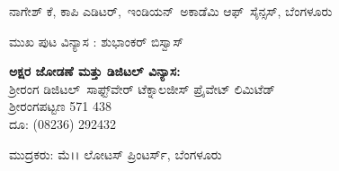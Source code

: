 {{\noindent
ನಾಗೇಶ್ ಕೆ, ಕಾಪಿ ಎಡಿಟರ್,\, ಇಂಡಿಯನ್\, ಅಕಾಡೆಮಿ ಆಫ್\,  ಸೈನ್ಸಸ್, ಬೆಂಗಳೂರು 

\noindent
ಮುಖ ಪುಟ ವಿನ್ಯಾಸ : ಶುಭಾಂಕರ್ ಬಿಸ್ವಾಸ್ 

\smallskip

\begin{flushleft}
 \textbf{ಅಕ್ಷರ ಜೋಡಣೆ ಮತ್ತು ಡಿಜಿಟಲ್ ವಿನ್ಯಾಸ:}\\\vspace{0.05cm}
 ಶ‍್ರೀರಂಗ ಡಿಜಿಟಲ್\, ಸಾಫ್ಟ್‌ವೇರ್ ಟೆಕ್ನಾಲಜೀಸ್ ಪ್ರೈವೇಟ್ ಲಿಮಿಟೆಡ್\\\vspace{0.05cm}
 ಶ‍್ರೀರಂಗಪಟ್ಟಣ \enginline{-} 571 438\\ \vspace{0.05cm}
 ದೂ: (08236) \enginline{-} 292432\vspace{0.05cm}
\end{flushleft}

\smallskip

\noindent
ಮುದ್ರಕರು: ಮೆ।। ಲೋಟಸ್ ಪ್ರಿಂಟರ್ಸ್, ಬೆಂಗಳೂರು

}}
